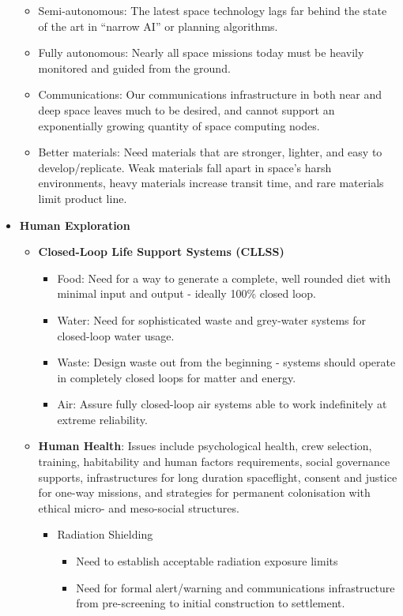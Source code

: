\documentclass[letter,11pt]{article}
\begin{document}
\begin{itemize}
\begin{itemize}
			\item Semi-autonomous: The latest space technology lags far behind the state of the art in ``narrow AI'' or planning algorithms.
			\item Fully autonomous: Nearly all space missions today must be heavily monitored and guided from the ground.
			\item Communications: Our communications infrastructure in both near and deep space leaves much to be desired, and cannot support an exponentially growing quantity of space computing nodes.
			\item Better materials: Need materials that are stronger, lighter, and easy to develop/replicate. Weak materials fall apart in space's harsh environments, heavy materials increase transit time, and rare materials limit product line.
		\end{itemize}
	\item \textbf{Human Exploration} \begin{itemize}
			\item \textbf{Closed-Loop Life Support Systems (CLLSS)} \begin{itemize}
					\item Food: Need for a way to generate a complete, well rounded diet with minimal input and output - ideally 100\% closed loop.
					\item Water: Need for sophisticated waste and grey-water systems for closed-loop water usage.
					\item Waste: Design waste out from the beginning - systems should operate in completely closed loops for matter and energy.
					\item Air: Assure fully closed-loop air systems able to work indefinitely at extreme reliability.
				\end{itemize}
			\item \textbf{Human Health}: Issues include psychological health, crew selection, training, habitability and human factors requirements, social governance supports, infrastructures for long duration spaceflight, consent and justice for one-way missions, and strategies for permanent colonisation with ethical micro- and meso-social structures. \begin{itemize}
					\item Radiation Shielding \begin{itemize}
							\item Need to establish acceptable radiation exposure limits
							\item Need for formal alert/warning and communications infrastructure from pre-screening to initial construction to settlement.

\end{itemize}
\end{itemize}
\end{itemize}
\end{itemize}
\end{document}
